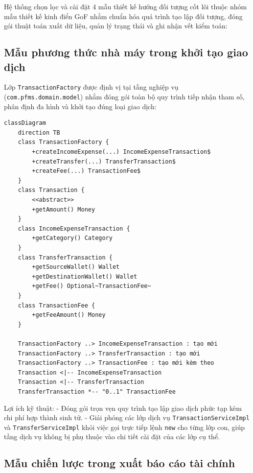 \documentclass[a4paper,12pt]{report}
\newcommand{\passthrough}[1]{#1}
\begin{document}
Hệ thống chọn lọc và cài đặt 4 mẫu thiết kế hướng đối tượng cốt lõi
thuộc nhóm mẫu thiết kế kinh điển GoF nhằm chuẩn hóa quá trình tạo lập
đối tượng, đóng gói thuật toán xuất dữ liệu, quản lý trạng thái và ghi
nhận vết kiểm toán:

\subsection{Mẫu phương thức nhà máy trong khởi tạo giao
dịch}\label{mux1eabu-phux1b0ux1a1ng-thux1ee9c-nhuxe0-muxe1y-trong-khux1edfi-tux1ea1o-giao-dux1ecbch}

Lớp \passthrough{\lstinline!TransactionFactory!} được định vị tại tầng
nghiệp vụ (\passthrough{\lstinline!com.pfms.domain.model!}) nhằm đóng
gói toàn bộ quy trình tiếp nhận tham số, phân định đa hình và khởi tạo
đúng loại giao dịch:

\begin{lstlisting}
classDiagram
    direction TB
    class TransactionFactory {
        +createIncomeExpense(...) IncomeExpenseTransaction$
        +createTransfer(...) TransferTransaction$
        +createFee(...) TransactionFee$
    }
    class Transaction {
        <<abstract>>
        +getAmount() Money
    }
    class IncomeExpenseTransaction {
        +getCategory() Category
    }
    class TransferTransaction {
        +getSourceWallet() Wallet
        +getDestinationWallet() Wallet
        +getFee() Optional~TransactionFee~
    }
    class TransactionFee {
        +getFeeAmount() Money
    }

    TransactionFactory ..> IncomeExpenseTransaction : tạo mới
    TransactionFactory ..> TransferTransaction : tạo mới
    TransactionFactory ..> TransactionFee : tạo mới kèm theo
    Transaction <|-- IncomeExpenseTransaction
    Transaction <|-- TransferTransaction
    TransferTransaction *-- "0..1" TransactionFee
\end{lstlisting}

Lợi ích kỹ thuật: - Đóng gói trọn vẹn quy trình tạo lập giao dịch phức
tạp kèm chi phí hợp thành sinh tử. - Giải phóng các lớp dịch vụ
\passthrough{\lstinline!TransactionServiceImpl!} và
\passthrough{\lstinline!TransferServiceImpl!} khỏi việc gọi trực tiếp
lệnh \passthrough{\lstinline!new!} cho từng lớp con, giúp tầng dịch vụ
không bị phụ thuộc vào chi tiết cài đặt của các lớp cụ thể.

\subsection{Mẫu chiến lược trong xuất báo cáo tài
chính}\label{mux1eabu-chiux1ebfn-lux1b0ux1ee3c-trong-xuux1ea5t-buxe1o-cuxe1o-tuxe0i-chuxednh}
\end{document}
